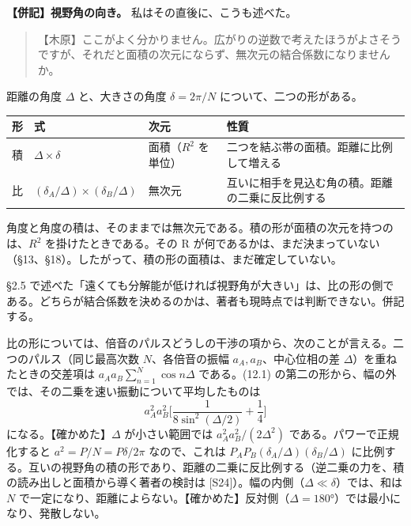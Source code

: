 \documentclass[
  a4paper,
]{ltjsarticle}
\newcounter{none} %
\begin{document}
\textbf{【併記】視野角の向き。} 私はその直後に、こうも述べた。

\begin{quote}
【木原】ここがよく分かりません。広がりの逆数で考えたほうがよさそうですが、それだと面積の次元にならず、無次元の結合係数になりませんか。
\end{quote}

距離の角度 \(\Delta\) と、大きさの角度 \(\delta = 2\pi/N\)
について、二つの形がある。

{\def\LTcaptype{none} %
\begin{longtable}[]{@{}
  >{\raggedright\arraybackslash}p{}
  >{\raggedright\arraybackslash}p{}
  >{\raggedright\arraybackslash}p{}
  >{\raggedright\arraybackslash}p{}@{}}
\toprule\noalign{}
\begin{minipage}[b]{\linewidth}\raggedright
形
\end{minipage} & \begin{minipage}[b]{\linewidth}\raggedright
式
\end{minipage} & \begin{minipage}[b]{\linewidth}\raggedright
次元
\end{minipage} & \begin{minipage}[b]{\linewidth}\raggedright
性質
\end{minipage} \\
\midrule\noalign{}
\endhead
\bottomrule\noalign{}
\endlastfoot
積 & \(\Delta\times\delta\) & 面積（\(R^2\) を単位） &
二つを結ぶ帯の面積。距離に比例して増える \\
比 & \((\delta_A/\Delta)\times(\delta_B/\Delta)\) & 無次元 &
互いに相手を見込む角の積。距離の二乗に反比例する \\
\end{longtable}
}

角度と角度の積は、そのままでは無次元である。積の形が面積の次元を持つのは、\(R^2\)
を掛けたときである。その R
が何であるかは、まだ決まっていない（§13、§18）。したがって、積の形の面積は、まだ確定していない。

§2.5
で述べた「遠くても分解能が低ければ視野角が大きい」は、比の形の側である。どちらが結合係数を決めるのかは、著者も現時点では判断できない。併記する。

比の形については、倍音のパルスどうしの干渉の項から、次のことが言える。二つのパルス（同じ最高次数
\(N\)、各倍音の振幅 \(a_A, a_B\)、中心位相の差
\(\Delta\)）を重ねたときの交差項は \(a_Aa_B\sum_{n=1}^N\cos n\Delta\)
である。(12.1)
の第二の形から、幅の外では、その二乗を速い振動について平均したものは \[
a_A^2a_B^2\Big[\frac{1}{8\sin^2(\Delta/2)} + \frac14\Big] \tag{12.2}
\] になる。【確かめた】\(\Delta\) が小さい範囲では
\(a_A^2a_B^2/(2\Delta^2)\) である。パワーで正規化すると
\(a^2 = P/N = P\delta/2\pi\) なので、これは
\(P_AP_B(\delta_A/\Delta)(\delta_B/\Delta)\)
に比例する。互いの視野角の積の形であり、距離の二乗に反比例する（逆二乗の力を、積の読み出しと面積から導く著者の検討は
{[}S24{]}）。幅の内側（\(\Delta \ll \delta\)）では、和は \(N\)
で一定になり、距離によらない。【確かめた】反対側（\(\Delta = 180°\)）では最小になり、発散しない。
\end{document}
